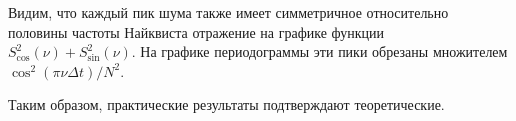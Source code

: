 \documentclass[12pt]{article}
\begin{document}
\vspace{10pt}
\begin{minipage}[h]{\linewidth}
\end{minipage}

\vspace{10pt}
\begin{minipage}[h]{\linewidth}
\end{minipage}

\vspace{\baselineskip}

Видим, что каждый пик шума также имеет симметричное относительно половины частоты Найквиста отражение на графике функции $ S_{\cos}^2(\nu) + S_{\sin}^2(\nu) $. На графике периодограммы эти пики обрезаны множителем $ \cos^2(\pi \nu \Delta t) / N^2 $. \par

\vspace{\baselineskip}

Таким образом, практические результаты подтверждают теоретические.
\end{document}
